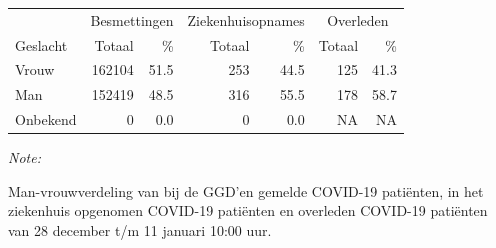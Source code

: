 \documentclass[
  english,
  man,floatsintext]{apa6}
\begin{document}
\begin{table}
\centering\begingroup\fontsize{11}{13}\selectfont

\begin{threeparttable}
\begin{tabular}{lrrrrrr}
\toprule
\multicolumn{1}{c}{ } & \multicolumn{2}{c}{Besmettingen} & \multicolumn{2}{c}{Ziekenhuisopnames} & \multicolumn{2}{c}{Overleden} \\
\cmidrule(l{3pt}r{3pt}){2-3} \cmidrule(l{3pt}r{3pt}){4-5} \cmidrule(l{3pt}r{3pt}){6-7}
Geslacht & Totaal & \% & Totaal & \% & Totaal & \%\\
\midrule
Vrouw & 162104 & 51.5 & 253 & 44.5 & 125 & 41.3\\
Man & 152419 & 48.5 & 316 & 55.5 & 178 & 58.7\\
Onbekend & 0 & 0.0 & 0 & 0.0 & NA & NA\\
\bottomrule
\end{tabular}
\begin{tablenotes}
\item \textit{Note: } 
\item Man-vrouwverdeling van bij de GGD’en gemelde COVID-19 patiënten, in het ziekenhuis opgenomen COVID-19 patiënten en overleden COVID-19 patiënten van 28 december t/m 11 januari 10:00 uur.
\end{tablenotes}
\end{threeparttable}
\endgroup{}
\end{table}
\newpage
\end{document}
